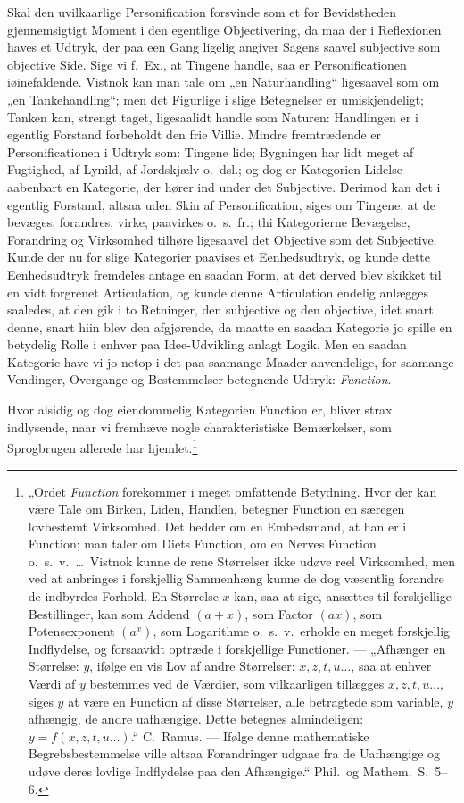 \documentclass[12pt]{book}
\newcommand{\opage}[1]{\marginnote{\footnotesize\textit{[#1]}}}
\begin{document}
Skal den uvilkaarlige Personification forsvinde som et for Bevidstheden gjennemsigtigt Moment i den
egentlige Objectivering, da maa der i Reflexionen haves et Udtryk, der
\opage{276} paa een Gang ligelig angiver Sagens saavel subjective som objective Side. Sige vi f.\ Ex., at Tingene
handle, saa er Personificationen iøinefaldende. Vistnok kan man tale om „en Naturhandling“ ligesaavel
som om „en Tankehandling“; men det Figurlige i slige Betegnelser er umiskjendeligt; Tanken kan, strengt
taget, ligesaalidt handle som Naturen: Handlingen er i egentlig Forstand forbeholdt den frie Villie.
Mindre fremtrædende er Personificationen i Udtryk som: Tingene lide; Bygningen har lidt meget af
Fugtighed, af Lynild, af Jordskjælv o.\ dsl.; og dog er Kategorien Lidelse aabenbart en Kategorie, der
hører ind under det Subjective. Derimod kan det i egentlig Forstand, altsaa uden Skin af
Personification, siges om Tingene, at de bevæges, forandres, virke, paavirkes o.\ s.\ fr.; thi
Kategorierne Bevægelse, Forandring og Virksomhed tilhøre ligesaavel det Objective som det Subjective.
Kunde der nu for slige Kategorier paavises et Eenhedsudtryk, og kunde dette Eenhedsudtryk fremdeles
antage en saadan Form, at det derved blev skikket til en vidt forgrenet Articulation, og kunde denne
Articulation endelig anlægges saaledes, at den gik i to Retninger, den subjective og den objective,
idet snart denne, snart hiin blev den afgjørende, da maatte en saadan Kategorie jo spille en betydelig
Rolle i enhver paa Idee-Udvikling anlagt Logik. Men en saadan Kategorie have vi jo netop i det paa
saamange Maader anvendelige, for saamange Vendinger, Overgange og Bestemmelser betegnende Udtryk:
\emph{Function}.

Hvor alsidig og dog eiendommelig Kategorien Function er, bliver strax indlysende, naar vi fremhæve
nogle charakteristiske Bemærkelser, som Sprogbrugen allerede har hjemlet.\footnote{„Ordet
\emph{Function} forekommer i meget omfattende Betydning. Hvor der kan være Tale om Birken, Liden,
Handlen, betegner Function en særegen lovbestemt Virksomhed. Det hedder om en Embedsmand, at han er i
Function; man taler om Diets Function, om en Nerves Function o.\ s.\ v.\ \ldots\ Vistnok kunne de rene
Størrelser ikke udøve reel Virksomhed, men ved at anbringes i forskjellig Sammenhæng kunne de dog
væsentlig forandre de indbyrdes Forhold. En Størrelse $x$ kan, saa at sige, ansættes til forskjellige
Bestillinger, kan som Addend $(a + x)$, som Factor $(ax)$, som Potensexponent $(a^{x})$, som Logarithme
o.\ s.\ v.\ erholde en meget forskjellig Indflydelse, og forsaavidt optræde i forskjellige Functioner.
--- „Afhænger en Størrelse: $y$, ifølge en vis Lov af andre Størrelser: $x, z, t, u \ldots$, saa at
enhver Værdi af $y$ bestemmes ved de Værdier, som vilkaarligen tillægges $x, z, t, u \ldots$, siges $y$
at være en Function af disse Størrelser, alle betragtede som variable, $y$ afhængig, de andre
uafhængige. Dette betegnes almindeligen: $y = f(x, z, t, u \ldots)$.“ C.\ Ramus. --- Ifølge denne
mathematiske Begrebsbestemmelse ville altsaa Forandringer udgaae fra de Uafhængige og udøve deres
lovlige Indflydelse paa den Afhængige.“ Phil.\ og Mathem.\ S.~5--6.}
\end{document}

